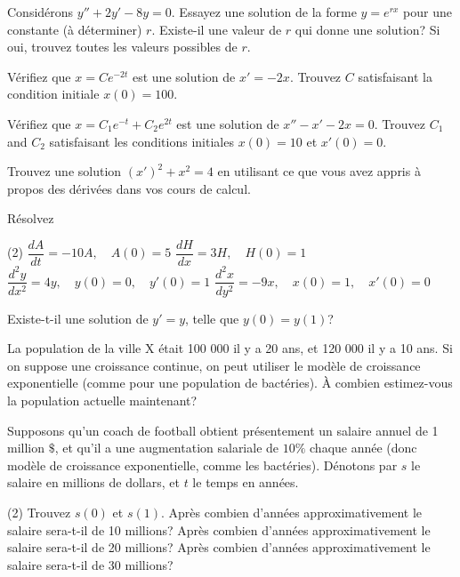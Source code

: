\begin{exercise}
Considérons $y'' + 2y' - 8y = 0$.  
Essayez une solution de la forme $y = e^{rx}$ pour une constante (à déterminer) $r$.  Existe-il une valeur de $r$ qui donne une solution? Si oui, trouvez toutes les valeurs possibles de $r$.
\end{exercise}

\begin{exercise}
Vérifiez que $x = C e^{-2t}$ est une solution de $x' = -2x$.
Trouvez $C$ satisfaisant la condition initiale $x(0) = 100$.
\end{exercise}

\begin{exercise}
	Vérifiez que $x = C_1 e^{-t} + C_2 e^{2t}$ est une solution de $x'' - x' -2 x =
	0$.  Trouvez $C_1$ and $C_2$ satisfaisant les conditions initiales $x(0) = 10$
	et $x'(0) = 0$.
\end{exercise}

\begin{exercise}
	Trouvez une solution
	${(x')}^2 + x^2 = 4$
	en utilisant ce que vous avez appris à propos des dérivées dans vos cours de calcul.
\end{exercise}

\begin{exercise}
	Résolvez 
	\begin{tasks}(2)
		\task $\dfrac{dA}{dt} = -10 A, \quad A(0)=5$
		\task $\dfrac{dH}{dx} = 3 H, \quad H(0)=1$
		\task $\dfrac{d^2y}{dx^2} = 4 y, \quad y(0)=0, \quad y'(0)=1$
		\task $\dfrac{d^2x}{dy^2} = -9 x, \quad x(0)=1, \quad x'(0)=0$
	\end{tasks}
\end{exercise}

\begin{exercise}
	Existe-t-il une solution de $y' = y$, telle que $y(0) = y(1)$?
\end{exercise}

\begin{exercise}
	La population de la ville X était 100 000 il y a 20 ans, et 120 000 il y a 10 ans.  Si on suppose une croissance continue, on peut utiliser le modèle de croissance exponentielle (comme pour une population de bactéries).  À combien estimez-vous la population actuelle maintenant?
\end{exercise}

\begin{exercise}
	Supposons qu'un coach de football obtient présentement un salaire annuel de 1 million $\$$, et qu'il a une augmentation salariale de $10\%$ chaque année (donc modèle de croissance exponentielle, comme les bactéries).  Dénotons par $s$ le salaire en millions de dollars, et $t$ le temps en années.
	\begin{tasks}(2)
	\task Trouvez $s(0)$ et $s(1)$.
	\task Après combien d'années approximativement le salaire sera-t-il de 10 millions?
	\task Après combien d'années approximativement le salaire sera-t-il de 20 millions?
	\task Après combien d'années approximativement le salaire sera-t-il de 30 millions?
	\end{tasks}
\end{exercise}



